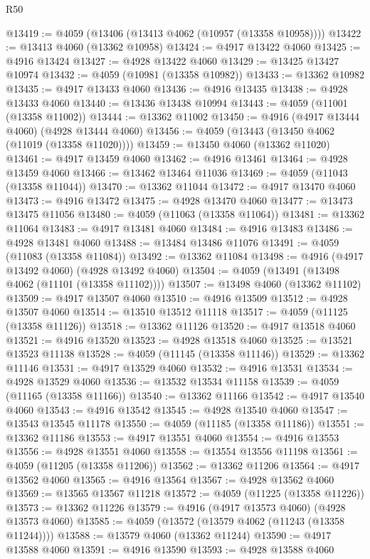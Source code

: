 \begin{lexlean}{R50}
\begin{coremodule}
@13419 := @4059 (@13406 (@13413 @4062 (@10957 (@13358 @10958))))
@13422 := @13413 @4060 (@13362 @10958)
@13424 := @4917 @13422 @4060
@13425 := @4916 @13424
@13427 := @4928 @13422 @4060
@13429 := @13425 @13427 @10974
@13432 := @4059 (@10981 (@13358 @10982))
@13433 := @13362 @10982
@13435 := @4917 @13433 @4060
@13436 := @4916 @13435
@13438 := @4928 @13433 @4060
@13440 := @13436 @13438 @10994
@13443 := @4059 (@11001 (@13358 @11002))
@13444 := @13362 @11002
@13450 := @4916 (@4917 @13444 @4060) (@4928 @13444 @4060)
@13456 := @4059 (@13443 (@13450 @4062 (@11019 (@13358 @11020))))
@13459 := @13450 @4060 (@13362 @11020)
@13461 := @4917 @13459 @4060
@13462 := @4916 @13461
@13464 := @4928 @13459 @4060
@13466 := @13462 @13464 @11036
@13469 := @4059 (@11043 (@13358 @11044))
@13470 := @13362 @11044
@13472 := @4917 @13470 @4060
@13473 := @4916 @13472
@13475 := @4928 @13470 @4060
@13477 := @13473 @13475 @11056
@13480 := @4059 (@11063 (@13358 @11064))
@13481 := @13362 @11064
@13483 := @4917 @13481 @4060
@13484 := @4916 @13483
@13486 := @4928 @13481 @4060
@13488 := @13484 @13486 @11076
@13491 := @4059 (@11083 (@13358 @11084))
@13492 := @13362 @11084
@13498 := @4916 (@4917 @13492 @4060) (@4928 @13492 @4060)
@13504 := @4059 (@13491 (@13498 @4062 (@11101 (@13358 @11102))))
@13507 := @13498 @4060 (@13362 @11102)
@13509 := @4917 @13507 @4060
@13510 := @4916 @13509
@13512 := @4928 @13507 @4060
@13514 := @13510 @13512 @11118
@13517 := @4059 (@11125 (@13358 @11126))
@13518 := @13362 @11126
@13520 := @4917 @13518 @4060
@13521 := @4916 @13520
@13523 := @4928 @13518 @4060
@13525 := @13521 @13523 @11138
@13528 := @4059 (@11145 (@13358 @11146))
@13529 := @13362 @11146
@13531 := @4917 @13529 @4060
@13532 := @4916 @13531
@13534 := @4928 @13529 @4060
@13536 := @13532 @13534 @11158
@13539 := @4059 (@11165 (@13358 @11166))
@13540 := @13362 @11166
@13542 := @4917 @13540 @4060
@13543 := @4916 @13542
@13545 := @4928 @13540 @4060
@13547 := @13543 @13545 @11178
@13550 := @4059 (@11185 (@13358 @11186))
@13551 := @13362 @11186
@13553 := @4917 @13551 @4060
@13554 := @4916 @13553
@13556 := @4928 @13551 @4060
@13558 := @13554 @13556 @11198
@13561 := @4059 (@11205 (@13358 @11206))
@13562 := @13362 @11206
@13564 := @4917 @13562 @4060
@13565 := @4916 @13564
@13567 := @4928 @13562 @4060
@13569 := @13565 @13567 @11218
@13572 := @4059 (@11225 (@13358 @11226))
@13573 := @13362 @11226
@13579 := @4916 (@4917 @13573 @4060) (@4928 @13573 @4060)
@13585 := @4059 (@13572 (@13579 @4062 (@11243 (@13358 @11244))))
@13588 := @13579 @4060 (@13362 @11244)
@13590 := @4917 @13588 @4060
@13591 := @4916 @13590
@13593 := @4928 @13588 @4060

\end{coremodule}
\end{lexlean}
